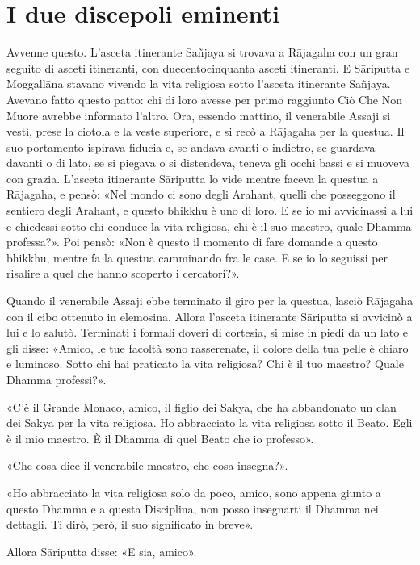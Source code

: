 \chapter{I due discepoli eminenti}

 Avvenne questo. L’asceta itinerante Sañjaya si trovava a
Rājagaha con un gran seguito di asceti itineranti, con duecentocinquanta asceti
itineranti. E Sāriputta e Moggallāna stavano vivendo la vita religiosa sotto
l’asceta itinerante Sañjaya. Avevano fatto questo patto: chi di loro avesse per
primo raggiunto Ciò Che Non Muore avrebbe informato l’altro. Ora, essendo
mattino, il venerabile Assaji si vestì, prese la ciotola e la veste superiore, e
si recò a Rājagaha per la questua. Il suo portamento ispirava fiducia e, se
andava avanti o indietro, se guardava davanti o di lato, se si piegava o si
distendeva, teneva gli occhi bassi e si muoveva con grazia. L’asceta itinerante
Sāriputta lo vide mentre faceva la questua a Rājagaha, e pensò: «Nel mondo ci
sono degli Arahant, quelli che posseggono il sentiero degli Arahant, e questo
bhikkhu è uno di loro. E se io mi avvicinassi a lui e chiedessi sotto chi
conduce la vita religiosa, chi è il suo maestro, quale Dhamma professa?». Poi
pensò: «Non è questo il momento di fare domande a questo bhikkhu, mentre fa la
questua camminando fra le case. E se io lo seguissi per risalire a quel che
hanno scoperto i cercatori?».

Quando il venerabile Assaji ebbe terminato il giro per la questua, lasciò
Rājagaha con il cibo ottenuto in elemosina. Allora l’asceta itinerante Sāriputta
si avvicinò a lui e lo salutò. Terminati i formali doveri di cortesia, si mise
in piedi da un lato e gli disse: «Amico, le tue facoltà sono rasserenate, il
colore della tua pelle è chiaro e luminoso. Sotto chi hai praticato la vita
religiosa? Chi è il tuo maestro? Quale Dhamma professi?».

«C’è il Grande Monaco, amico, il figlio dei Sakya, che ha abbandonato un clan
dei Sakya per la vita religiosa. Ho abbracciato la vita religiosa sotto il
Beato. Egli è il mio maestro. È il Dhamma di quel Beato che io professo».

«Che cosa dice il venerabile maestro, che cosa insegna?».

«Ho abbracciato la vita religiosa solo da poco, amico, sono appena giunto a
questo Dhamma e a questa Disciplina, non posso insegnarti il Dhamma nei
dettagli. Ti dirò, però, il suo significato in breve».

Allora Sāriputta disse: «E sia, amico».

